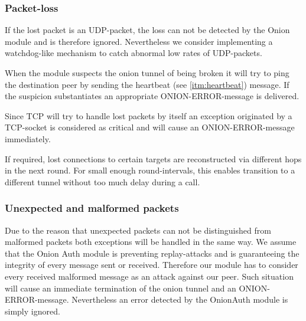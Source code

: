 \documentclass{article}
\begin{document}
\subsubsection{Packet-loss}
\label{subsec:packet_loss_exception}
If the lost packet is an UDP-packet, the loss can not be detected by the Onion module and is
therefore ignored. Nevertheless we consider implementing a watchdog-like mechanism to catch
abnormal low rates of UDP-packets.

When the module suspects the onion tunnel of being broken it will try to ping the destination peer
by sending the heartbeat (see \ref{itm:heartbeat}) message. If the suspicion substantiates an
appropriate ONION-ERROR-message is delivered.

Since TCP will try to handle lost packets by itself an exception originated by a TCP-socket is
considered as critical and will cause an ONION-ERROR-message immediately.

If required, lost connections to certain targets are reconstructed via different hops in the next round. For small enough round-intervals, this enables transition to a different tunnel without too much delay during a call.

\subsubsection{Unexpected and malformed packets}
Due to the reason that unexpected packets can not be distinguished from malformed packets both
exceptions will be handled in the same way. We assume that the Onion Auth module is preventing
replay-attacks and is guaranteeing the integrity of every message sent or received. Therefore our
module has to consider every received malformed message as an attack against our peer. Such
situation will cause an immediate termination of the onion tunnel and an ONION-ERROR-message.
Nevertheless an error detected by the OnionAuth module is simply ignored.
\end{document}

